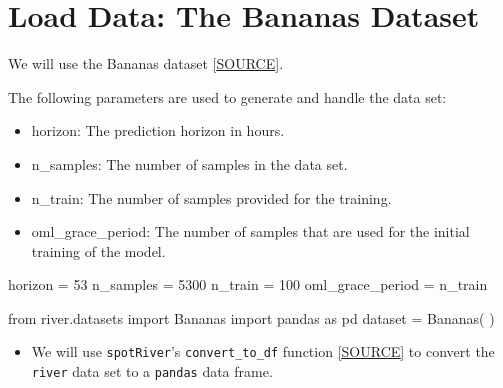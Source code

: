 \documentclass[
  letterpaper,
  DIV=11,
  numbers=noendperiod]{scrreprt}
\newenvironment{Shaded}{\begin{snugshade}}{\end{snugshade}}
\newcommand{\DecValTok}[1]{\textcolor[rgb]{0.68,0.00,0.00}{#1}}
\newcommand{\ImportTok}[1]{\textcolor[rgb]{0.00,0.46,0.62}{#1}}
\newcommand{\NormalTok}[1]{\textcolor[rgb]{0.00,0.23,0.31}{#1}}
\newcommand{\OperatorTok}[1]{\textcolor[rgb]{0.37,0.37,0.37}{#1}}
\providecommand{\tightlist}{%
  \setlength{\itemsep}{0pt}\setlength{\parskip}{0pt}}\usepackage{longtable,booktabs,array}
\begin{document}
\hypertarget{load-data-the-bananas-dataset}{%
\section{Load Data: The Bananas
Dataset}\label{load-data-the-bananas-dataset}}

We will use the Bananas dataset
\href{https://riverml.xyz/0.19.0/api/datasets/Bananas/}{{[}SOURCE{]}}.

The following parameters are used to generate and handle the data set:

\begin{itemize}
\tightlist
\item
  horizon: The prediction horizon in hours.
\item
  n\_samples: The number of samples in the data set.
\item
  n\_train: The number of samples provided for the training.
\item
  oml\_grace\_period: The number of samples that are used for the
  initial training of the model.
\end{itemize}

\begin{Shaded}
\begin{Highlighting}[]
\NormalTok{horizon }\OperatorTok{=} \DecValTok{53}
\NormalTok{n\_samples }\OperatorTok{=} \DecValTok{5300}
\NormalTok{n\_train }\OperatorTok{=} \DecValTok{100}
\NormalTok{oml\_grace\_period }\OperatorTok{=}\NormalTok{ n\_train}
\end{Highlighting}
\end{Shaded}

\begin{Shaded}
\begin{Highlighting}[]
\ImportTok{from}\NormalTok{ river.datasets }\ImportTok{import}\NormalTok{ Bananas}
\ImportTok{import}\NormalTok{ pandas }\ImportTok{as}\NormalTok{ pd}
\NormalTok{dataset }\OperatorTok{=}\NormalTok{ Bananas(}
\NormalTok{)}
\end{Highlighting}
\end{Shaded}

\begin{itemize}
\tightlist
\item
  We will use \texttt{spotRiver}'s \texttt{convert\_to\_df} function
  \href{https://github.com/sequential-parameter-optimization/spotRiver/blob/main/src/spotRiver/utils/data_conversion.py}{{[}SOURCE{]}}
  to convert the \texttt{river} data set to a \texttt{pandas} data
  frame.
\end{itemize}
\end{document}
